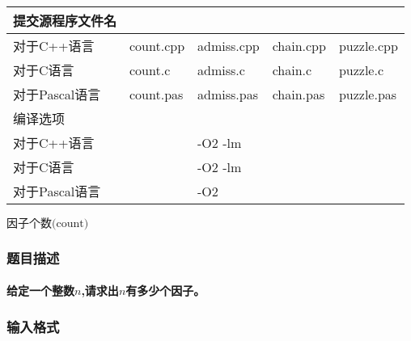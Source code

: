 \documentclass[final,11pt,oneside,UTF8]{report}
\begin{document}
\begin{table}[h]
\begin{tabular}{lllll}
        提交源程序文件名                         &                                &                                 &                                &                                      \\ \hline
        \multicolumn{1}{|l|}{对于C++语言}    & \multicolumn{1}{l|}{count.cpp} & \multicolumn{1}{l|}{admiss.cpp} & \multicolumn{1}{l|}{chain.cpp} & \multicolumn{1}{l|}{puzzle.cpp}      \\ \hline
        \multicolumn{1}{|l|}{对于C语言}      & \multicolumn{1}{l|}{count.c}   & \multicolumn{1}{l|}{admiss.c}   & \multicolumn{1}{l|}{chain.c}   & \multicolumn{1}{l|}{puzzle.c}        \\ \hline
        \multicolumn{1}{|l|}{对于Pascal语言} & \multicolumn{1}{l|}{count.pas} & \multicolumn{1}{l|}{admiss.pas} & \multicolumn{1}{l|}{chain.pas} & \multicolumn{1}{l|}{puzzle.pas}      \\ \hline
        编译选项                             &                                &                                 &                                &                                      \\ \hline
        \multicolumn{1}{|l|}{对于C++语言}    & \multicolumn{1}{l}{}           & \multicolumn{1}{l}{-O2 -lm}     & \multicolumn{1}{l}{}           & \multicolumn{1}{l|}{}                \\ \hline
        \multicolumn{1}{|l|}{对于C语言}      & \multicolumn{1}{l}{}           & \multicolumn{1}{l}{-O2 -lm}     & \multicolumn{1}{l}{}           & \multicolumn{1}{l|}{}                \\ \hline
        \multicolumn{1}{|l|}{对于Pascal语言} & \multicolumn{1}{l}{}           & \multicolumn{1}{l}{-O2}         & \multicolumn{1}{l}{}           & \multicolumn{1}{l|}{}                \\ \hline
    \end{tabular}
\end{table}
\newpage

\centerline{\LARGE{$\textbf{因子个数}\text{(count)}$}}
\subsubsection{题目描述}
\paragraph{
    给定一个整数$n$,请求出$n$有多少个因子。
}
\subsubsection{输入格式}
\end{document}
